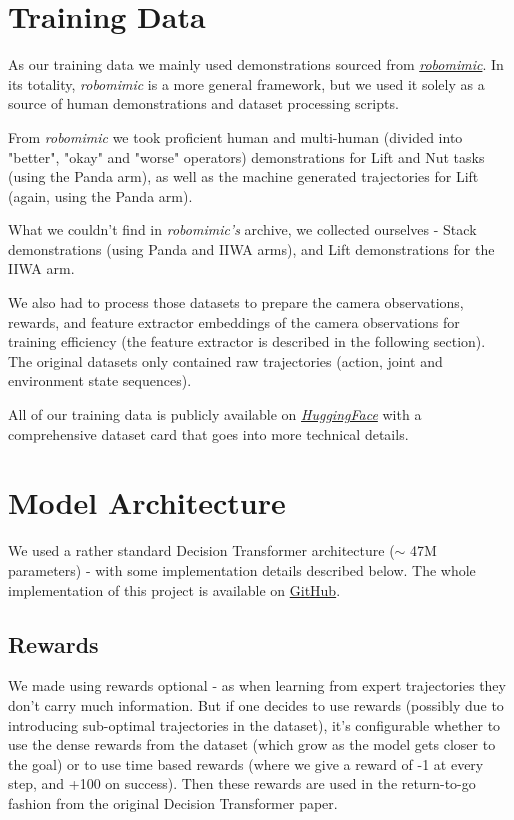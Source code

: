 \documentclass{article}
\begin{document}
\section{Training Data}
As our training data we mainly used demonstrations sourced from \href{https://huggingface.co/datasets/robomimic/robomimic_datasets}{\textit{robomimic}}.
In its totality, \textit{robomimic} is a more general framework, but we used it solely as a source of human demonstrations and dataset processing scripts.

From \textit{robomimic} we took proficient human and multi-human (divided into "better", "okay" and "worse" operators) demonstrations for Lift and Nut tasks (using the Panda arm),
as well as the machine generated trajectories for Lift (again, using the Panda arm).

What we couldn't find in \textit{robomimic's} archive, we collected ourselves - Stack demonstrations (using Panda and IIWA arms), and Lift demonstrations for the IIWA arm.

We also had to process those datasets to prepare the camera observations, rewards, and feature extractor embeddings of the camera observations for training efficiency (the feature extractor is described in the following section).
The original datasets only contained raw trajectories (action, joint and environment state sequences).

All of our training data is publicly available on \href{https://huggingface.co/datasets/aboguszewski/robomimic}{\textit{HuggingFace}} with a comprehensive dataset card that goes into more technical details.

\section{Model Architecture}
We used  a rather standard Decision Transformer architecture ($\sim$ 47M parameters) - with some implementation details described below.
The whole implementation of this project is available on \href{https://github.com/czechuuu/micro-vla}{GitHub}.
\subsection{Rewards}
We made using rewards optional - as when learning from expert trajectories they don't carry much information.
But if one decides to use rewards (possibly due to introducing sub-optimal trajectories in the dataset), it's configurable whether to use the dense rewards from the dataset (which grow as the model gets closer to the goal) or to use time based rewards (where we give a reward of -1 at every step, and +100 on success).
Then these rewards are used in the return-to-go fashion from the original Decision Transformer paper.
\end{document}
